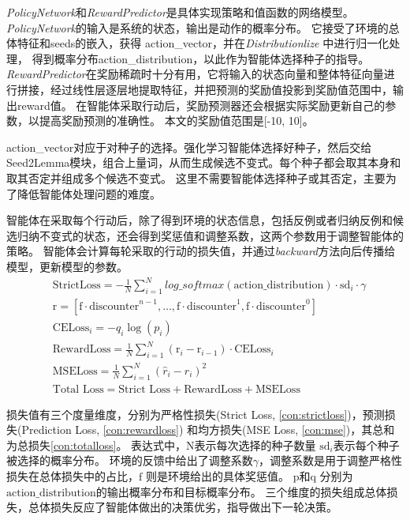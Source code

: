 \textit{PolicyNetwork}和\textit{RewardPredictor}是具体实现策略和值函数的网络模型。
\textit{PolicyNetwork}的输入是系统的状态，输出是动作的概率分布。
它接受了环境的总体特征和seeds的嵌入，获得 action\_vector，并在\textit{Distributionlize} 中进行归一化处理，
得到概率分布action\_distribution，以此作为智能体选择种子的指导。
\textit{RewardPredictor}在奖励稀疏时十分有用，它将输入的状态向量和整体特征向量进行拼接，经过线性层逐层地提取特征，并把预测的奖励值投影到奖励值范围中，输出reward值。
在智能体采取行动后，奖励预测器还会根据实际奖励更新自己的参数，以提高奖励预测的准确性。
本文的奖励值范围是[-10, 10]。

action\_vector对应于对种子的选择。强化学习智能体选择好种子，然后交给Seed2Lemma模块，组合上量词，从而生成候选不变式。每个种子都会取其本身和取其否定并组成多个候选不变式。
这里不需要智能体选择种子或其否定，主要为了降低智能体处理问题的难度。

智能体在采取每个行动后，除了得到环境的状态信息，包括反例或者归纳反例和候选归纳不变式的状态，还会得到奖惩值和调整系数，这两个参数用于调整智能体的策略。
智能体会计算每轮采取的行动的损失值，并通过\textit{backward}方法向后传播给模型，更新模型的参数。
\begin{align}
	&\text{StrictLoss} = - \frac{1}{N} \sum_{i=1}^{N} log\_softmax(\text{action\_distribution}) \cdot \text{sd}_i \cdot \gamma \label{con:strictloss} \\
	&\text{r} = \left[ \text{f} \cdot \text{discounter}^{n-1}, \ldots , \text{f} \cdot \text{discounter}^1, \text{f} \cdot \text{discounter}^{0} \right] \label{con:r}\\
	&\text{CELoss}_i = -q_{i} \log(p_{i}) \label{con:celoss} \\
	&\text{RewardLoss} = \frac{1}{N} \sum_{i=1}^{N} (\text{r}_{i} - \text{r}_{i-1}) \cdot \text{CELoss}_i \label{con:rewardloss} \\
	&\text{MSELoss} = \frac{1}{N} \sum_{i=1}^{N} (\hat{r}_i - r_i)^2\label{con:mse} \\
	&\text{Total Loss} = \text{Strict Loss}+\text{RewardLoss}+\text{MSELoss} \label{con:totalloss}
\end{align}

损失值有三个度量维度，分别为严格性损失(Strict Loss, \ref{con:strictloss})，预测损失(Prediction Loss, \ref{con:rewardloss})
和均方损失(MSE Loss, \ref{con:mse})，其总和为总损失\ref{con:totalloss}。
表达式中，$\text{N}$表示每次选择的种子数量 $\text{sd}_i$表示每个种子被选择的概率分布。
环境的反馈中给出了调整系数$\gamma$，调整系数是用于调整严格性损失在总体损失中的占比，$\text{f}$ 则是环境给出的具体奖惩值。
$\text{p}$和$\text{q}$ 分别为$\text{action\_distribution}$的输出概率分布和目标概率分布。
三个维度的损失组成总体损失，总体损失反应了智能体做出的决策优劣，指导做出下一轮决策。

